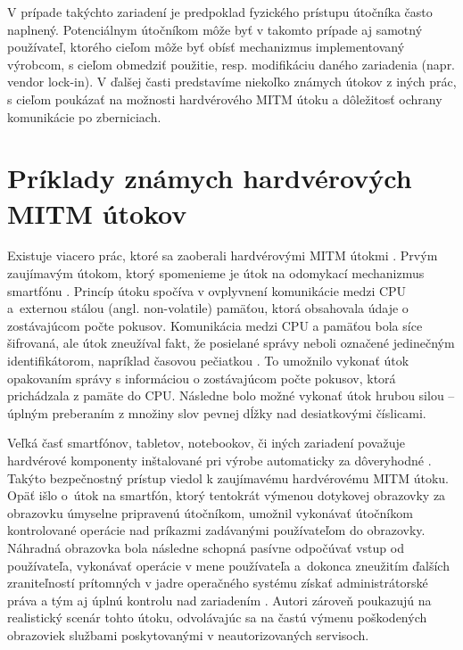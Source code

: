 V prípade takýchto zariadení je predpoklad fyzického prístupu útočníka často naplnený. Potenciálnym útočníkom môže byť v takomto prípade aj samotný používateľ, ktorého cieľom môže byť obísť mechanizmus implementovaný výrobcom, s cieľom obmedziť použitie, resp. modifikáciu daného zariadenia (napr. vendor lock-in). V ďalšej časti predstavíme niekoľko známych útokov z iných prác, s cieľom poukázať na možnosti hardvérového MITM útoku a dôležitosť ochrany komunikácie po zberniciach.

\section{Príklady známych hardvérových MITM útokov}
Existuje viacero prác, ktoré sa zaoberali hardvérovými MITM útokmi \cite{mitmSmartphone, mitmTouch, mitmTPM, mitmBitlocker, mitmI2C}. Prvým zaujímavým útokom, ktorý spomenieme je útok na odomykací mechanizmus smartfónu \cite{mitmSmartphone}. Princíp útoku spočíva v ovplyvnení komunikácie medzi CPU a~externou stálou (angl. non-volatile) pamäťou, ktorá obsahovala údaje o zostávajúcom počte pokusov. Komunikácia medzi CPU a pamäťou bola síce šifrovaná, ale útok zneužíval fakt, že posielané správy neboli označené jedinečným identifikátorom, napríklad časovou pečiatkou \cite{mitmSmartphone}. To umožnilo vykonať útok opakovaním správy s informáciou o zostávajúcom počte pokusov, ktorá prichádzala z pamäte do CPU. Následne bolo možné vykonať útok hrubou silou -- úplným preberaním z množiny slov pevnej dĺžky nad desiatkovými číslicami.

Veľká časť smartfónov, tabletov, notebookov, či iných zariadení považuje hardvérové komponenty inštalované pri výrobe automaticky za dôveryhodné \cite{mitmTouch}. Takýto bezpečnostný prístup viedol k zaujímavému hardvérovému MITM útoku. Opäť išlo o~útok na smartfón, ktorý tentokrát výmenou dotykovej obrazovky za obrazovku úmyselne pripravenú útočníkom, umožnil vykonávať útočníkom kontrolované operácie nad príkazmi zadávanými používateľom do obrazovky. Náhradná obrazovka bola následne schopná pasívne odpočúvať vstup od používateľa, vykonávať operácie v mene používateľa a~dokonca zneužitím ďalších zraniteľností prítomných v jadre operačného systému získať administrátorské práva a tým aj úplnú kontrolu nad zariadením \cite{mitmTouch}. Autori zároveň poukazujú na realistický scenár tohto útoku, odvolávajúc sa na častú výmenu poškodených obrazoviek službami poskytovanými v neautorizovaných servisoch.

